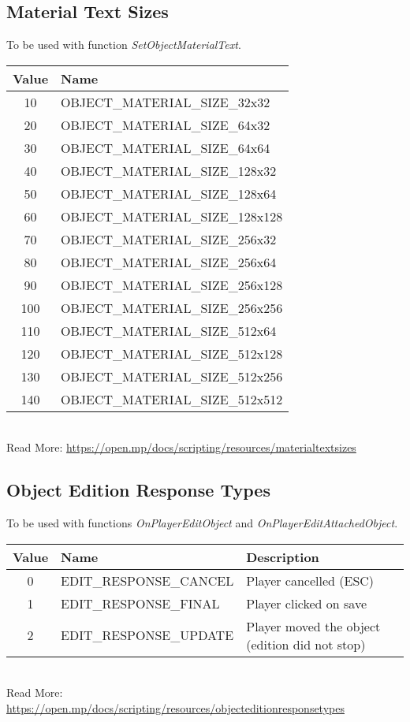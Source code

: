 \documentclass{article}
\begin{document}
\subsection{Material Text Sizes}
To be used with function \textit{SetObjectMaterialText}.
\bigskip
\\\begin{tabular}{ |c|l| }
\hline
Value & Name \\
\hline
10 & OBJECT\_MATERIAL\_SIZE\_32x32 \\
20 & OBJECT\_MATERIAL\_SIZE\_64x32 \\
30 & OBJECT\_MATERIAL\_SIZE\_64x64 \\
40 & OBJECT\_MATERIAL\_SIZE\_128x32 \\
50 & OBJECT\_MATERIAL\_SIZE\_128x64 \\
60 & OBJECT\_MATERIAL\_SIZE\_128x128 \\
70 & OBJECT\_MATERIAL\_SIZE\_256x32 \\
80 & OBJECT\_MATERIAL\_SIZE\_256x64 \\
90 & OBJECT\_MATERIAL\_SIZE\_256x128 \\
100 & OBJECT\_MATERIAL\_SIZE\_256x256 \\
110 & OBJECT\_MATERIAL\_SIZE\_512x64 \\
120 & OBJECT\_MATERIAL\_SIZE\_512x128 \\
130 & OBJECT\_MATERIAL\_SIZE\_512x256 \\
140 & OBJECT\_MATERIAL\_SIZE\_512x512 \\
\hline
\end{tabular}
\bigskip
\\Read More: \url{https://open.mp/docs/scripting/resources/materialtextsizes}

\subsection{Object Edition Response Types}
To be used with functions \textit{OnPlayerEditObject} and \textit{OnPlayerEditAttachedObject}.
\bigskip
\\\begin{tabular}{ |c|l|l| }
\hline
Value & Name & Description \\
\hline
0 & EDIT\_RESPONSE\_CANCEL & Player cancelled (ESC) \\
1 & EDIT\_RESPONSE\_FINAL & Player clicked on save \\
2 & EDIT\_RESPONSE\_UPDATE & Player moved the object (edition did not stop) \\
\hline
\end{tabular}
\bigskip
\\Read More: \url{https://open.mp/docs/scripting/resources/objecteditionresponsetypes}
\end{document}
